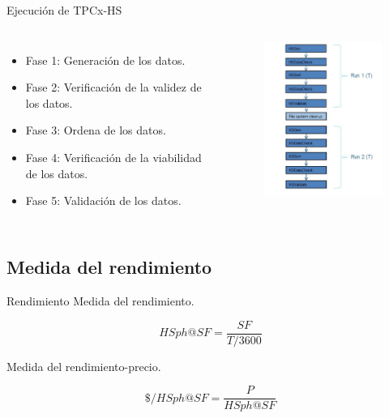 		\begin{frame}{Ejecución de TPCx-HS}
				\begin{columns}[c]
					
					\begin{itemize}
						\item Fase 1: Generación de los datos.
						\item Fase 2: Verificación de la validez de los datos.
						\item Fase 3: Ordena de los datos.
						\item Fase 4: Verificación de la viabilidad de los datos.
						\item Fase 5: Validación de los datos.
					\end{itemize}
					
					\begin{figure}[H]
						\centering
						\includegraphics[width=5cm]{./Images/executionsTPC.png}
					\end{figure}

				\end{columns}
	
		\end{frame}
		
	\subsection*{Medida del rendimiento}	
			
		\begin{frame}{Rendimiento}		
			\color{ChetwodeBlue}\large Medida del rendimiento. 
								
					$$ HSph@SF = \frac{SF}{T/3600} $$				
				
			\color{ChetwodeBlue}\large Medida del rendimiento-precio.
			
					$$ \$/HSph@SF = \frac{P}{HSph@SF} $$
		\end{frame}
				 